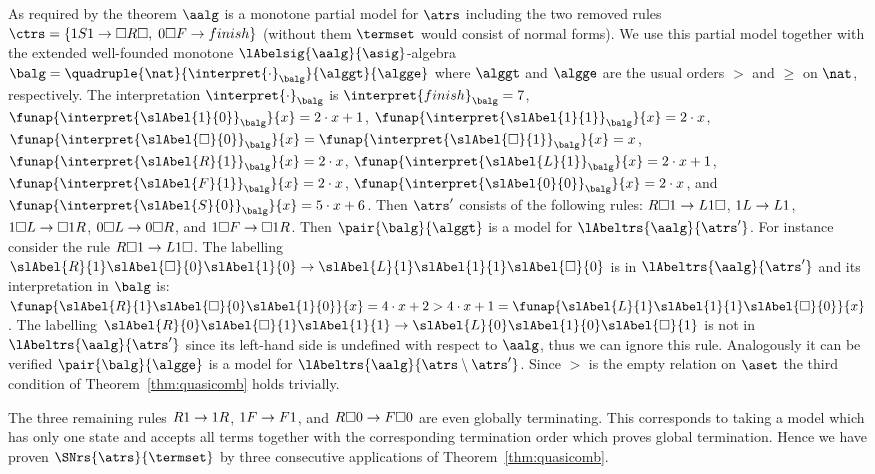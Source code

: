 \begin{example}
{  \noindent As required by the theorem $\aalg$ is a monotone partial model for $\atrs$ including the two removed rules
  $\ctrs = \{\free\start\free \to \wall\sright\wall,\; \blank\wall\slleft \to \finish\}$
  (without them $\termset$ would consist of normal forms).
  We use this partial model together with the extended well-founded monotone $\lAbelsig{\aalg}{\asig}$-algebra 
  $\balg= \quadruple{\nat}{\interpret{\cdot}_\balg}{{\alggt}}{{\algge}}$ 
  where $\alggt$ and $\algge$ are the usual orders $>$ and $\ge$ on $\nat$, respectively.
  The interpretation $\interpret{\cdot}_\balg$ is
  $\interpret{\finish}_\balg = 7$,
  $\funap{\interpret{\slAbel{\free}{0}}_\balg}{x} = 2\cdot x + 1$,
  $\funap{\interpret{\slAbel{\free}{1}}_\balg}{x} = 2\cdot x$,
  $\funap{\interpret{\slAbel{\wall}{0}}_\balg}{x} = \funap{\interpret{\slAbel{\wall}{1}}_\balg}{x} = x$,
  $\funap{\interpret{\slAbel{\sright}{1}}_\balg}{x} = 2\cdot x$,
  $\funap{\interpret{\slAbel{\sleft}{1}}_\balg}{x} = 2\cdot x + 1$,
  $\funap{\interpret{\slAbel{\slleft}{1}}_\balg}{x} = 2\cdot x$,
  $\funap{\interpret{\slAbel{\blank}{0}}_\balg}{x} = 2\cdot x$, and
  $\funap{\interpret{\slAbel{\start}{0}}_\balg}{x} = 5\cdot x + 6$.
  Then $\atrs'$ consists of the following rules:
  $R\Box1 \to L1\Box$, 
  $1L \to L1$, 
  $1\Box L \to \Box1R$, 
  $0\Box L \to 0\Box R$, and
  $1\Box F \to \Box1R$.
  Then $\pair{\balg}{{\alggt}}$ is a model for $\lAbeltrs{\aalg}{\atrs'}$.
  For instance consider the rule $R\Box1 \to L1\Box$.
  The labelling
  $\slAbel{\sright}{1}\slAbel{\wall}{0}\slAbel{\free}{0} \to \slAbel{\sleft}{1}\slAbel{\free}{1}\slAbel{\wall}{0}$
  is in $\lAbeltrs{\aalg}{\atrs'}$ 
  and its interpretation in $\balg$ is:
  $\funap{\slAbel{\sright}{1}\slAbel{\wall}{0}\slAbel{\free}{0}}{x} 
   = 4\cdot x + 2 
   > 4\cdot x + 1
   = \funap{\slAbel{\sleft}{1}\slAbel{\free}{1}\slAbel{\wall}{0}}{x}$.
  The labelling
  $\slAbel{\sright}{0}\slAbel{\wall}{1}\slAbel{\free}{1} \to \slAbel{\sleft}{0}\slAbel{\free}{0}\slAbel{\wall}{1}$
  is not in $\lAbeltrs{\aalg}{\atrs'}$ since its left-hand side is undefined with respect to $\aalg$,
  thus we can ignore this rule.
  Analogously it can be verified 
  $\pair{\balg}{{\algge}}$ is a model for $\lAbeltrs{\aalg}{\atrs \setminus \atrs'}$.
Since $>$ is the empty relation on $\aset$
  the third condition of Theorem~\ref{thm:quasicomb} holds trivially.

  The three remaining rules
  $R1 \to 1R$, $1F \to F1$, and $R\Box0 \to F\Box0$
  are even globally terminating.
  This corresponds to taking a model which has only one state and accepts all terms
  together with the corresponding termination order which proves global termination.
Hence we have proven $\SNrs{\atrs}{\termset}$ by three consecutive applications of Theorem~\ref{thm:quasicomb}.
}\end{example}

